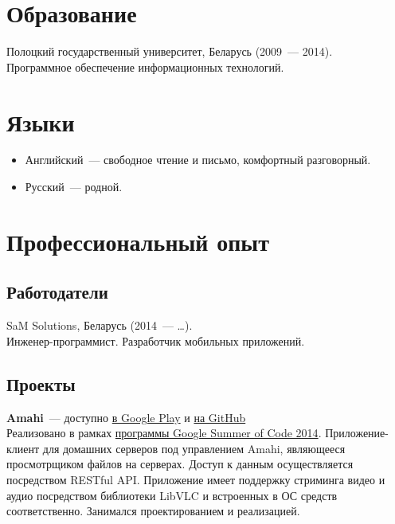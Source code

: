   \section*{Образование}

    Полоцкий государственный университет, Беларусь (2009~--- 2014). \\
    Программное обеспечение информационных технологий.


  \section*{Языки}

    \begin{itemize}

      \item Английский~--- свободное чтение и письмо, комфортный разговорный.

      \item Русский~--- родной.

    \end{itemize}


  \section*{Профессиональный опыт}

    \subsection*{Работодатели}

      SaM Solutions, Беларусь (2014~--- \dots). \\
      Инженер-программист. Разработчик мобильных приложений.

    \subsection*{Проекты}

      \textbf{Amahi}~--- доступно \href{https://play.google.com/store/apps/details?id=org.amahi.anywhere}{в Google Play}
        и \href{https://github.com/amahi/android}{на GitHub} \\

        Реализовано в рамках \href{https://developers.google.com/open-source/soc}{программы Google Summer of Code 2014}.
        Приложение-клиент для домашних серверов под управлением Amahi, являющееся
        просмотрщиком файлов на серверах. Доступ к данным осуществляется
        посредством RESTful API. Приложение имеет поддержку стриминга
        видео и аудио посредством библиотеки LibVLC и встроенных в ОС
        средств соответственно. Занимался проектированием и реализацией. \\

